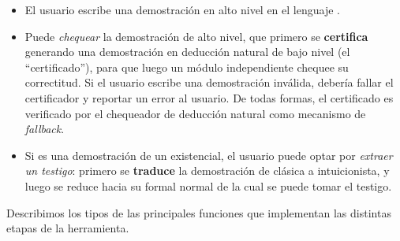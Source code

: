 \begin{itemize}
    \item El usuario escribe una demostración en alto nivel en el lenguaje \ppaLang{}.
    \item Puede \textit{chequear} la demostración de alto nivel, que primero se \textbf{certifica} generando una demostración en deducción natural de bajo nivel (el ``certificado''), para que luego un módulo independiente chequee su correctitud.
    Si el usuario escribe una demostración inválida, debería fallar el certificador y reportar un error al usuario. De todas formas, el certificado es verificado por el chequeador de deducción natural como mecanismo de \textit{fallback}.
    \item Si es una demostración de un existencial, el usuario puede optar por \textit{extraer un testigo}: primero se \textbf{traduce} la demostración de clásica a intuicionista, y luego se reduce hacia su formal normal de la cual se puede tomar el testigo.
\end{itemize}

Describimos los tipos de las principales funciones que implementan las distintas etapas de la herramienta.

